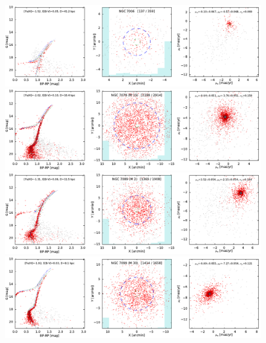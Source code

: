 \documentclass[usenatbib]{mnras}
\begin{document}
\clearpage\begin{figure}
\contcaption{}
\includegraphics{figs/NGC_7006.pdf}
\includegraphics{figs/NGC_7078_M_15.pdf}
\includegraphics{figs/NGC_7089_M_2.pdf}
\includegraphics{figs/NGC_7099_M_30.pdf}
\end{figure}
\end{document}
